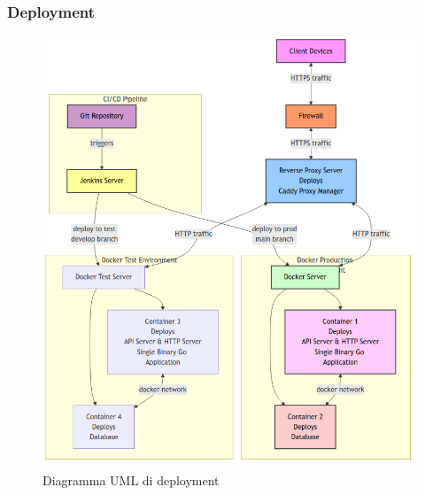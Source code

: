 \documentclass{article}
\begin{document}
\subsubsection{Deployment}
\begin{figure}[H]
    \centering
    \includegraphics[width=1\textwidth]{uml-deployment}
    \caption{Diagramma UML di deployment}
    \label{fig:deployment}
\end{figure}
\end{document}
